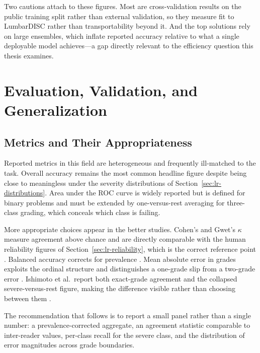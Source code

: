Two cautions attach to these figures. Most are cross-validation results on the
public training split rather than external validation, so they measure fit to
LumbarDISC rather than transportability beyond it. And the top solutions rely on
large ensembles, which inflate reported accuracy relative to what a single
deployable model achieves---a gap directly relevant to the efficiency question
this thesis examines.

\section{Evaluation, Validation, and Generalization}
\label{sec:lr-validation}

\subsection{Metrics and Their Appropriateness}
\label{sec:lr-metrics}

Reported metrics in this field are heterogeneous and frequently ill-matched to
the task. Overall accuracy remains the most common headline figure despite being
close to meaningless under the severity distributions of
Section~\ref{sec:lr-distributions}. Area under the ROC curve is widely reported
\cite{batra2025mscan,wang2024machine} but is defined for binary problems and must
be extended by one-versus-rest averaging for three-class grading, which conceals
which class is failing.

More appropriate choices appear in the better studies. Cohen's and Gwet's
$\kappa$ measure agreement above chance and are directly comparable with the
human reliability figures of Section~\ref{sec:lr-reliability}, which is the
correct reference point \cite{lim2022improved,su2022automatic,mcsweeney2023external}.
Balanced accuracy corrects for prevalence \cite{mcsweeney2023external,acharya2026disccentric}.
Mean absolute error in grades exploits the ordinal structure and distinguishes a
one-grade slip from a two-grade error \cite{niemeyer2021a,wu2026external}.
Ishimoto et al.\ report both exact-grade agreement and the collapsed
severe-versus-rest figure, making the difference visible rather than choosing
between them \cite{ishimoto2020could}.

The recommendation that follows is to report a small panel rather than a single
number: a prevalence-corrected aggregate, an agreement statistic comparable to
inter-reader values, per-class recall for the severe class, and the distribution
of error magnitudes across grade boundaries.

